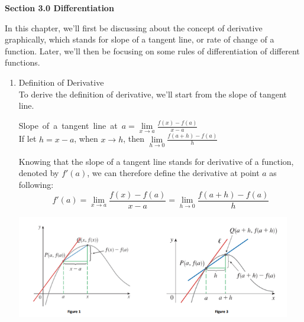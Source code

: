 \documentclass[12px]{article}
\begin{document}
\begin{center}
    \Large\textbf{Section 3.0 Differentiation}
\end{center}
\hspace*{2em} In this chapter, we'll first be discussing about the concept of derivative graphically, which stands for slope of a tangent line, or rate of change of a function. Later, we'll then be focusing on some rules of differentiation of different functions.
\begin{enumerate}
    \item Definition of Derivative\\
    \hspace*{2em} To derive the definition of derivative, 
    we'll start from the slope of tangent line.
    \begin{center}
        Slope\ of\ a\ tangent\ line\ at\ $a = \lim\limits_{x\to a}\frac{f(x)-f(a)}{x-a}$\\
        If let $h=x-a$, when $x\to h$, then $\lim\limits_{h\to0}\frac{f(a+h)-f(a)}{h}$
    \end{center}
    \hspace*{2em}Knowing that the slope of a tangent line stands for derivative of a function, denoted by $f'(a)$, we can therefore define the derivative at point $a$ as following:
    $$ f'(a)=\lim\limits_{x\to a}\frac{f(x)-f(a)}{x-a}=\lim\limits_{h\to0}\frac{f(a+h)-f(a)}{h}$$
    \begin{center}
        \includegraphics[width=12cm]{Def of Defferentiation.png}
    \end{center}


\end{enumerate}
\end{document}
